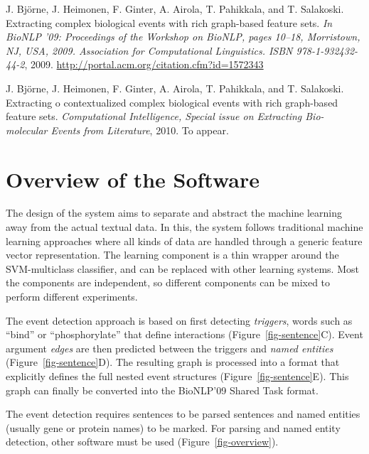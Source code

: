 \documentclass[a4paper,12pt]{article}
\begin{document}
\vspace{5 mm}

J. Bj{\"{o}}rne, J. Heimonen, F. Ginter, A. Airola, T. Pahikkala, and T.
Salakoski. Extracting complex biological events with rich graph-based feature
sets. \emph{In BioNLP ’09: Proceedings of the Workshop on BioNLP, pages 10–18,
Morristown, NJ, USA, 2009. Association for Computational Linguistics. ISBN
978-1-932432-44-2}, 2009. \url{http://portal.acm.org/citation.cfm?id=1572343}

\vspace{5 mm}
   
J. Bj{\"{o}}rne, J. Heimonen, F. Ginter, A. Airola, T. Pahikkala, and T.
Salakoski. Extracting o contextualized complex biological events with rich
graph-based feature sets. \emph{Computational Intelligence, Special issue on
Extracting Bio-molecular Events from Literature}, 2010. To appear.

\section{Overview of the Software}

The design of the system aims to separate and abstract the machine learning away
from the actual textual data. In this, the system follows traditional machine
learning approaches where all kinds of data are handled through a generic feature
vector representation. The learning component is a thin wrapper around the
SVM-multiclass classifier, and can be replaced with other learning systems. Most
the components are independent, so different components can be mixed to perform
different experiments.

The event detection approach is based on first detecting \emph{triggers}, words
such as ``bind'' or ``phosphorylate'' that define interactions
(Figure~\ref{fig-sentence}C). Event argument \emph{edges} are then predicted
between the triggers and \emph{named entities} (Figure~\ref{fig-sentence}D).
The resulting graph is processed into a format that explicitly defines the full
nested event structures (Figure~\ref{fig-sentence}E). This graph can finally be
converted into the BioNLP'09 Shared Task format.

The event detection requires sentences to be parsed sentences and named
entities (usually gene or protein names) to be marked. For parsing and named
entity detection, other software must be used (Figure~\ref{fig-overview}).
\end{document}
